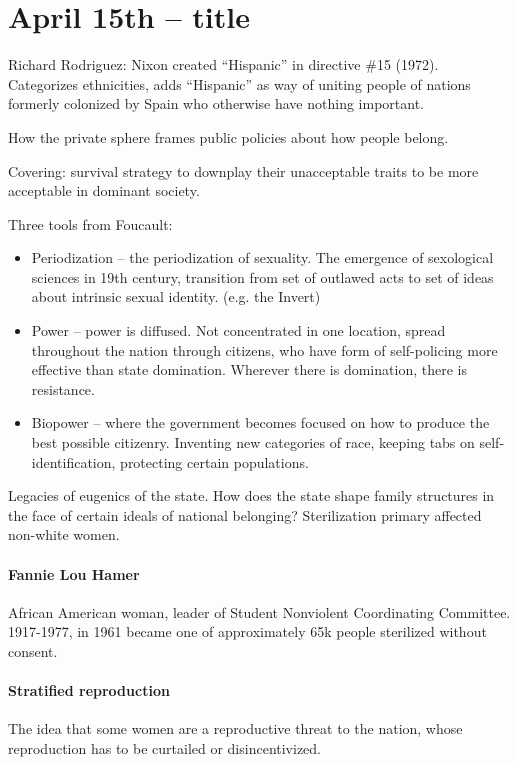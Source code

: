 \section{April 15th -- title}

Richard Rodriguez: Nixon created ``Hispanic'' in directive \#15 (1972). Categorizes ethnicities, adds ``Hispanic'' as way of uniting people of nations formerly colonized by Spain who otherwise have nothing important.

How the private sphere frames public policies about how people belong.

Covering: survival strategy to downplay their unacceptable traits to be more acceptable in dominant society.

Three tools from Foucault:
\begin{itemize}
	\item Periodization -- the periodization of sexuality. The emergence of sexological sciences in 19th century, transition from set of outlawed acts to set of ideas about intrinsic sexual identity. (e.g. the Invert) 
	\item Power -- power is diffused. Not concentrated in one location, spread throughout the nation through citizens, who have form of self-policing more effective than state domination. Wherever there is domination, there is resistance.
	\item Biopower -- where the government becomes focused on how to produce the best possible citizenry. Inventing new categories of race, keeping tabs on self-identification, protecting certain populations.
\end{itemize}

Legacies of eugenics of the state. How does the state shape family structures in the face of certain ideals of national belonging? Sterilization primary affected non-white women. 

\paragraph{Fannie Lou Hamer} African American woman, leader of Student Nonviolent Coordinating Committee. 1917-1977, in 1961 became one of approximately 65k people sterilized without consent.

\paragraph{Stratified reproduction} The idea that some women are a reproductive threat to the nation, whose reproduction has to be curtailed or disincentivized.

